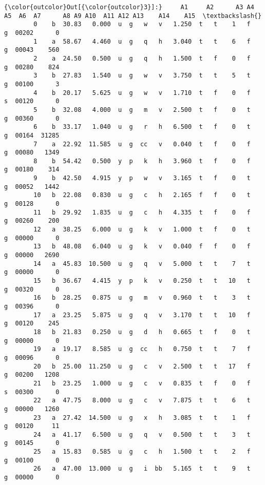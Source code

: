 \documentclass[11pt]{article}
\begin{document}
\begin{Verbatim}[commandchars=\\\{\}]
{\color{outcolor}Out[{\color{outcolor}3}]:}     A1     A2      A3 A4 A5  A6  A7      A8 A9 A10  A11 A12 A13    A14    A15  \textbackslash{}
        0    b  30.83   0.000  u  g   w   v   1.250  t   t    1   f   g  00202      0   
        1    a  58.67   4.460  u  g   q   h   3.040  t   t    6   f   g  00043    560   
        2    a  24.50   0.500  u  g   q   h   1.500  t   f    0   f   g  00280    824   
        3    b  27.83   1.540  u  g   w   v   3.750  t   t    5   t   g  00100      3   
        4    b  20.17   5.625  u  g   w   v   1.710  t   f    0   f   s  00120      0   
        5    b  32.08   4.000  u  g   m   v   2.500  t   f    0   t   g  00360      0   
        6    b  33.17   1.040  u  g   r   h   6.500  t   f    0   t   g  00164  31285   
        7    a  22.92  11.585  u  g  cc   v   0.040  t   f    0   f   g  00080   1349   
        8    b  54.42   0.500  y  p   k   h   3.960  t   f    0   f   g  00180    314   
        9    b  42.50   4.915  y  p   w   v   3.165  t   f    0   t   g  00052   1442   
        10   b  22.08   0.830  u  g   c   h   2.165  f   f    0   t   g  00128      0   
        11   b  29.92   1.835  u  g   c   h   4.335  t   f    0   f   g  00260    200   
        12   a  38.25   6.000  u  g   k   v   1.000  t   f    0   t   g  00000      0   
        13   b  48.08   6.040  u  g   k   v   0.040  f   f    0   f   g  00000   2690   
        14   a  45.83  10.500  u  g   q   v   5.000  t   t    7   t   g  00000      0   
        15   b  36.67   4.415  y  p   k   v   0.250  t   t   10   t   g  00320      0   
        16   b  28.25   0.875  u  g   m   v   0.960  t   t    3   t   g  00396      0   
        17   a  23.25   5.875  u  g   q   v   3.170  t   t   10   f   g  00120    245   
        18   b  21.83   0.250  u  g   d   h   0.665  t   f    0   t   g  00000      0   
        19   a  19.17   8.585  u  g  cc   h   0.750  t   t    7   f   g  00096      0   
        20   b  25.00  11.250  u  g   c   v   2.500  t   t   17   f   g  00200   1208   
        21   b  23.25   1.000  u  g   c   v   0.835  t   f    0   f   s  00300      0   
        22   a  47.75   8.000  u  g   c   v   7.875  t   t    6   t   g  00000   1260   
        23   a  27.42  14.500  u  g   x   h   3.085  t   t    1   f   g  00120     11   
        24   a  41.17   6.500  u  g   q   v   0.500  t   t    3   t   g  00145      0   
        25   a  15.83   0.585  u  g   c   h   1.500  t   t    2   f   g  00100      0   
        26   a  47.00  13.000  u  g   i  bb   5.165  t   t    9   t   g  00000      0   

\end{Verbatim}
\end{document}
